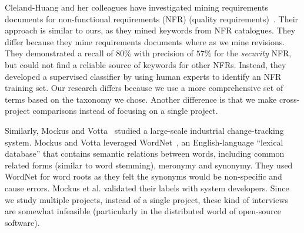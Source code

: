 \documentclass[smallextended]{svjour3}       %
\begin{document}
Cleland-Huang and her colleagues have investigated mining requirements documents for non-functional requirements (NFR) (quality requirements)~\cite{Cleland-Huang2006}. 
Their approach is similar to ours, as they mined keywords from NFR
catalogues.
They differ because they mine requirements documents where as we mine revisions.
They demonstrated a recall of $80\%$ with precision of $57\%$ for the \emph{security} NFR, but could not find a reliable source of keywords for other NFRs. 
Instead, they developed a supervised classifier by using human experts to identify an NFR training set. 
Our research differs because we use a more comprehensive set of terms based on the taxonomy we chose.
Another difference is that we make cross-project comparisons instead of focusing
on a single project.


Similarly, Mockus and Votta~\cite{Mockus00} studied a large-scale industrial change-tracking system. 
Mockus and Votta leveraged WordNet~\cite{Fellbaum1998}, an English-language ``lexical database'' that contains semantic relations between words, including common related forms (similar to word stemming), meronymy and synonymy.
They used WordNet for word roots as they felt the synonyms would be
non-specific and cause errors.
Mockus et al. validated their labels with system developers.
Since we study multiple projects, instead of a single project, these
kind of interviews are somewhat infeasible (particularly in the distributed world of open-source software).
\end{document}

